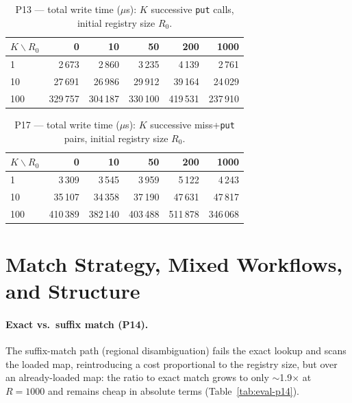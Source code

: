 \begin{table}[htbp]
  \centering
  \caption{P13 --- total write time ($\mu$s): $K$ successive \texttt{put} calls, initial registry
  size $R_0$.}
  \label{tab:eval-p13}
  \begin{tabular}{lrrrrr}
    \hline
    $K\backslash R_0$ & 0 & 10 & 50 & 200 & 1000 \\
    \hline
    1   & 2\,673   & 2\,860   & 3\,235   & 4\,139   & 2\,761   \\
    10  & 27\,691  & 26\,986  & 29\,912  & 39\,164  & 24\,029  \\
    100 & 329\,757 & 304\,187 & 330\,100 & 419\,531 & 237\,910 \\
    \hline
  \end{tabular}
\end{table}

\begin{table}[htbp]
  \centering
  \caption{P17 --- total write time ($\mu$s): $K$ successive miss+\texttt{put} pairs, initial
  registry size $R_0$.}
  \label{tab:eval-p17}
  \begin{tabular}{lrrrrr}
    \hline
    $K\backslash R_0$ & 0 & 10 & 50 & 200 & 1000 \\
    \hline
    1   & 3\,309   & 3\,545   & 3\,959   & 5\,122   & 4\,243   \\
    10  & 35\,107  & 34\,358  & 37\,190  & 47\,631  & 47\,817  \\
    100 & 410\,389 & 382\,140 & 403\,488 & 511\,878 & 346\,068 \\
    \hline
  \end{tabular}
\end{table}

\section{Match Strategy, Mixed Workflows, and Structure}
\label{sec:eval-secondary}

\paragraph{Exact vs.\ suffix match (P14).}
The suffix-match path (regional disambiguation) fails the exact lookup and scans the loaded map,
reintroducing a cost proportional to the registry size, but over an already-loaded map: the ratio
to exact match grows to only $\sim$1.9$\times$ at $R{=}1000$ and remains cheap in absolute terms
(Table~\ref{tab:eval-p14}).

